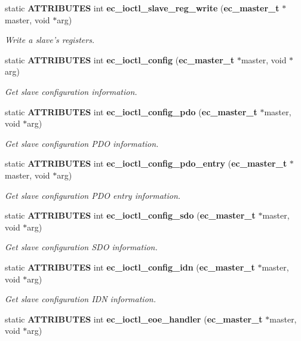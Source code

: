 \begin{DoxyCompactItemize}
static {\bf A\-T\-T\-R\-I\-B\-U\-T\-E\-S} int {\bf ec\-\_\-ioctl\-\_\-slave\-\_\-reg\-\_\-write} ({\bf ec\-\_\-master\-\_\-t} $\ast$master, void $\ast$arg)
\begin{DoxyCompactList}\small\item\em Write a slave's registers. \end{DoxyCompactList}\item 
static {\bf A\-T\-T\-R\-I\-B\-U\-T\-E\-S} int {\bf ec\-\_\-ioctl\-\_\-config} ({\bf ec\-\_\-master\-\_\-t} $\ast$master, void $\ast$arg)
\begin{DoxyCompactList}\small\item\em Get slave configuration information. \end{DoxyCompactList}\item 
static {\bf A\-T\-T\-R\-I\-B\-U\-T\-E\-S} int {\bf ec\-\_\-ioctl\-\_\-config\-\_\-pdo} ({\bf ec\-\_\-master\-\_\-t} $\ast$master, void $\ast$arg)
\begin{DoxyCompactList}\small\item\em Get slave configuration P\-D\-O information. \end{DoxyCompactList}\item 
static {\bf A\-T\-T\-R\-I\-B\-U\-T\-E\-S} int {\bf ec\-\_\-ioctl\-\_\-config\-\_\-pdo\-\_\-entry} ({\bf ec\-\_\-master\-\_\-t} $\ast$master, void $\ast$arg)
\begin{DoxyCompactList}\small\item\em Get slave configuration P\-D\-O entry information. \end{DoxyCompactList}\item 
static {\bf A\-T\-T\-R\-I\-B\-U\-T\-E\-S} int {\bf ec\-\_\-ioctl\-\_\-config\-\_\-sdo} ({\bf ec\-\_\-master\-\_\-t} $\ast$master, void $\ast$arg)
\begin{DoxyCompactList}\small\item\em Get slave configuration S\-D\-O information. \end{DoxyCompactList}\item 
static {\bf A\-T\-T\-R\-I\-B\-U\-T\-E\-S} int {\bf ec\-\_\-ioctl\-\_\-config\-\_\-idn} ({\bf ec\-\_\-master\-\_\-t} $\ast$master, void $\ast$arg)
\begin{DoxyCompactList}\small\item\em Get slave configuration I\-D\-N information. \end{DoxyCompactList}\item 
static {\bf A\-T\-T\-R\-I\-B\-U\-T\-E\-S} int {\bf ec\-\_\-ioctl\-\_\-eoe\-\_\-handler} ({\bf ec\-\_\-master\-\_\-t} $\ast$master, void $\ast$arg)

\end{DoxyCompactItemize}
